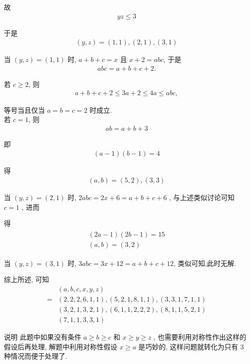 故
\begin{align*}
	y z \leqslant 3
\end{align*}

于是
\begin{align*}
	(y, z)=(1,1),(2,1),(3,1)
\end{align*}

当 $(y, z)=(1,1)$ 时, $a+b+c=x$ 且 $x+2=a b c$, 于是
\begin{align*}
	a b c=a+b+c+2 .
\end{align*}

若 $c \geqslant 2$, 则
\begin{align*}
	a+b+c+2 \leqslant 3 a+2 \leqslant 4 a \leqslant a b c,
\end{align*}

等号当且仅当 $a=b=c=2$ 时成立.\\
若 $c=1$, 则
\begin{align*}
	a b=a+b+3
\end{align*}

即
\begin{align*}
	(a-1)(b-1)=4
\end{align*}

得
\begin{align*}
	(a, b)=(5,2),(3,3)
\end{align*}

当 $(y, z)=(2,1)$ 时, $2 a b c=2 x+6=a+b+c+6$ , 与上述类似讨论可知 $c=1$ , 进而

得
\begin{align*}
	\begin{gathered}
		(2 a-1)(2 b-1)=15 \\
		(a, b)=(3,2)
	\end{gathered}
\end{align*}

当 $(y, z)=(3,1)$ 时, $3 a b c=3 x+12=a+b+c+12$, 类似可知,此时无解.

综上所述, 可知\begin{align}
	  & (a, b, c, x, y, z)                        \\
	= & (2,2,2,6,1,1),(5,2,1,8,1,1),(3,3,1,7,1,1) \\
	  & (3,2,1,3,2,1),(6,1,1,2,2,2),(8,1,1,5,2,1) \\
	  & (7,1,1,3,3,1)
\end{align}

说明 此题中如果没有条件 $a \geqslant b \geqslant c$ 和 $x \geqslant y \geqslant z$ , 也需要利用对称性作出这样的假设后再处理, 解题中利用对称性假设 $x \geqslant a$ 是巧妙的, 这样问题就转化为只有 3 种情况而便于处理了.

